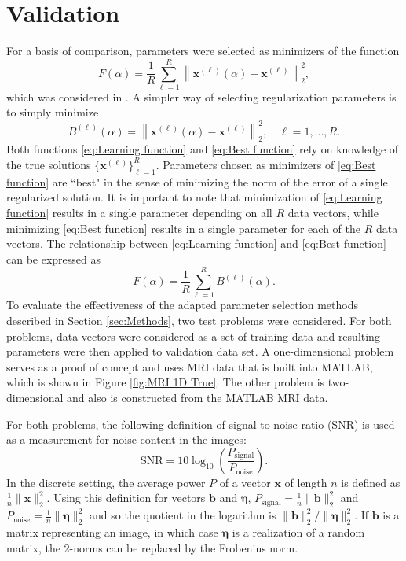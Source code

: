 \documentclass[12pt]{article}
\newcommand{\bVec}{\mathbf{b}}	%
\newcommand{\xVec}{\mathbf{x}}	%
\newcommand{\regparam}{\alpha}  %
\newcommand{\noise}{\eta}	%
\newcommand{\noiseVec}{\bm{\noise}}	%
\begin{document}
\section{Validation} \label{sec:Validation}
For a basis of comparison, parameters were selected as minimizers of the function
\begin{equation}
\label{eq:Learning function}
F(\regparam) = \frac{1}{R}\sum_{\ell=1}^R \left\|\xVec^{(\ell)}(\regparam) - \xVec^{(\ell)}\right\|_2^2,
\end{equation} 
which was considered in \cite{ChungEspanol2017}. A simpler way of selecting regularization parameters is to simply minimize
\begin{equation}
\label{eq:Best function}
B^{(\ell)}(\regparam) = \left\|\xVec^{(\ell)}(\regparam) - \xVec^{(\ell)}\right\|_2^2, \quad \ell = 1,\ldots,R.
\end{equation}
Both functions \eqref{eq:Learning function} and \eqref{eq:Best function} rely on knowledge of the true solutions $\{\xVec^{(\ell)}\}_{\ell=1}^R$. Parameters chosen as minimizers of \eqref{eq:Best function} are ``best" in the sense of minimizing the norm of the error of a single regularized solution. It is important to note that minimization of \eqref{eq:Learning function} results in a single parameter depending on all $R$ data vectors, while minimizing \eqref{eq:Best function} results in a single parameter for each of the $R$ data vectors. The relationship between \eqref{eq:Learning function} and \eqref{eq:Best function} can be expressed as
\[F(\regparam) = \frac{1}{R}\sum_{\ell=1}^R B^{(\ell)}(\regparam).\]
\indent To evaluate the effectiveness of the adapted parameter selection methods described in Section \ref{sec:Methods}, two test problems were considered. For both problems, data vectors were considered as a set of training data and resulting parameters were then applied to validation data set. A one-dimensional problem serves as a proof of concept and uses MRI data that is built into MATLAB, which is shown in Figure \ref{fig:MRI 1D True}. The other problem is two-dimensional and also is constructed from the MATLAB MRI data. \par
For both problems, the following definition of signal-to-noise ratio (SNR) is used as a measurement for noise content in the images:
\begin{equation}
\label{eq:SNR}
\text{SNR} = 10\log_{10}\left(\frac{P_{\text{signal}}}{P_{\text{noise}}}\right).
\end{equation}
In the discrete setting, the average power $P$ of a vector $\xVec$ of length $n$ is defined as $\frac{1}{n}\|\xVec\|^2_2$. Using this definition for vectors $\bVec$ and $\noiseVec$, $P_{\text{signal}} = \frac{1}{n}\|\bVec\|^2_2$ and $P_{\text{noise}} = \frac{1}{n}\|\noiseVec\|^2_2$ and so the quotient in the logarithm is $\|\bVec\|_2^2/\|\noiseVec\|_2^2$. If $\bVec$ is a matrix representing an image, in which case $\noiseVec$ is a realization of a random matrix, the 2-norms can be replaced by the Frobenius norm.
\end{document}
